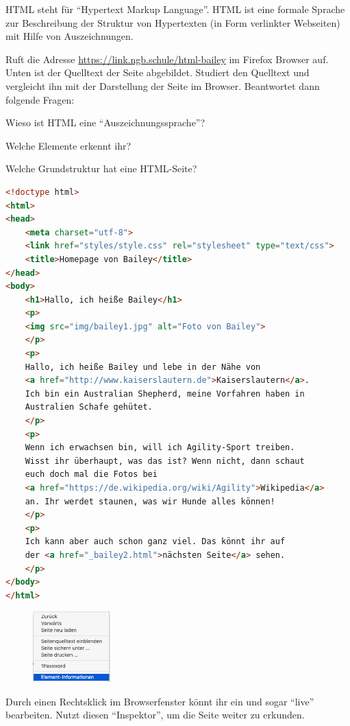 \documentclass[11pt, a4paper, ngerman]{arbeitsblatt}
\begin{document}
\ReiheTitel

HTML steht für \enquote{Hypertext Markup Language}. HTML ist
eine formale Sprache zur Beschreibung der Struktur von
Hypertexten (in Form verlinkter Webseiten) mit Hilfe von
Auszeichnungen.

\begin{aufgabe}[icon=\iconComputer]
Ruft die Adresse \url{https://link.ngb.schule/html-bailey} im
Firefox Browser auf. Unten ist der Quelltext der Seite abgebildet.
Studiert den Quelltext und vergleicht ihn mit der Darstellung
der Seite im Browser. Beantwortet dann folgende Fragen:
\begin{smallenum}
	\item Wieso ist HTML eine \enquote{Auszeichnungssprache}?
	\item Welche Elemente erkennt ihr?
	\item Welche Grundstruktur hat eine HTML-Seite?
\end{smallenum}
\begin{lstlisting}[language=HTML,basicstyle=\scriptsize\ttfamily]
<!doctype html>
<html>
<head>
	<meta charset="utf-8">
	<link href="styles/style.css" rel="stylesheet" type="text/css">
	<title>Homepage von Bailey</title>
</head>
<body>
	<h1>Hallo, ich heiße Bailey</h1>
	<p>
	<img src="img/bailey1.jpg" alt="Foto von Bailey">
	</p>
	<p>
	Hallo, ich heiße Bailey und lebe in der Nähe von
	<a href="http://www.kaiserslautern.de">Kaiserslautern</a>.
	Ich bin ein Australian Shepherd, meine Vorfahren haben in
	Australien Schafe gehütet.
	</p>
	<p>
	Wenn ich erwachsen bin, will ich Agility-Sport treiben.
	Wisst ihr überhaupt, was das ist? Wenn nicht, dann schaut
	euch doch mal die Fotos bei
	<a href="https://de.wikipedia.org/wiki/Agility">Wikipedia</a>
	an. Ihr werdet staunen, was wir Hunde alles können!
	</p>
	<p>
	Ich kann aber auch schon ganz viel. Das könnt ihr auf
	der <a href="_bailey2.html">nächsten Seite</a> sehen.
	</p>
</body>
</html>
\end{lstlisting}
\end{aufgabe}

\begin{wrapfix}
\begin{figure}
	\includegraphics[width=3cm]{8Diff-Ab.1-Abb_Menu.jpg}
\end{figure}
\begin{aufgabe}[icon=\iconComputer]
	Durch einen Rechtsklick im Browserfenster könnt ihr ein
	 und sogar \enquote{live} \\
	bearbeiten. Nutzt diesen \enquote{Inspektor}, um die Seite
	weiter zu erkunden.
\end{aufgabe}
\end{wrapfix}
\end{document}
